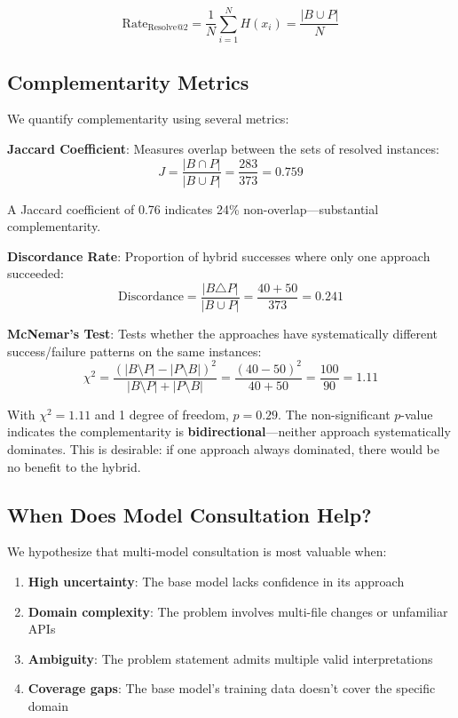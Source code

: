 \documentclass[11pt,a4paper]{article}
\begin{document}
\begin{equation}
\text{Rate}_{\text{Resolve@2}} = \frac{1}{N}\sum_{i=1}^{N} H(x_i) = \frac{|B \cup P|}{N}
\end{equation}

\subsection{Complementarity Metrics}

We quantify complementarity using several metrics:

\textbf{Jaccard Coefficient}: Measures overlap between the sets of resolved instances:
\begin{equation}
J = \frac{|B \cap P|}{|B \cup P|} = \frac{283}{373} = 0.759
\end{equation}

A Jaccard coefficient of 0.76 indicates 24\% non-overlap---substantial complementarity.

\textbf{Discordance Rate}: Proportion of hybrid successes where only one approach succeeded:
\begin{equation}
\text{Discordance} = \frac{|B \triangle P|}{|B \cup P|} = \frac{40 + 50}{373} = 0.241
\end{equation}

\textbf{McNemar's Test}: Tests whether the approaches have systematically different success/failure patterns on the same instances:
\begin{equation}
\chi^2 = \frac{(|B \setminus P| - |P \setminus B|)^2}{|B \setminus P| + |P \setminus B|} = \frac{(40 - 50)^2}{40 + 50} = \frac{100}{90} = 1.11
\end{equation}

With $\chi^2 = 1.11$ and 1 degree of freedom, $p = 0.29$. The non-significant $p$-value indicates the complementarity is \textbf{bidirectional}---neither approach systematically dominates. This is desirable: if one approach always dominated, there would be no benefit to the hybrid.

\subsection{When Does Model Consultation Help?}

We hypothesize that multi-model consultation is most valuable when:
\begin{enumerate}
    \item \textbf{High uncertainty}: The base model lacks confidence in its approach
    \item \textbf{Domain complexity}: The problem involves multi-file changes or unfamiliar APIs
    \item \textbf{Ambiguity}: The problem statement admits multiple valid interpretations
    \item \textbf{Coverage gaps}: The base model's training data doesn't cover the specific domain
\end{enumerate}
\end{document}
